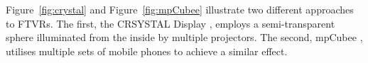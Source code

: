 Figure~\ref{fig:crystal} and Figure~\ref{fig:mpCubee} illustrate two different approaches to FTVRs. The first, the CRSYSTAL Display \cite{noauthor_crystal_nodate}, employs a semi-transparent sphere illuminated from the inside by multiple projectors. The second, mpCubee \cite{7892378}, utilises multiple sets of mobile phones to achieve a similar effect.

\begin{invisBox}
    \hfill
\end{invisBox}

